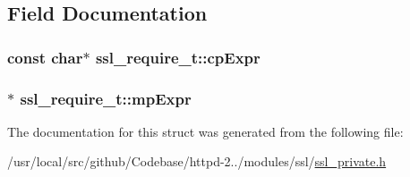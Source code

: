 \subsection{Field Documentation}
\subsubsection[{\texorpdfstring{cp\+Expr}{cpExpr}}]{\setlength{\rightskip}{0pt plus 5cm}const char$\ast$ ssl\+\_\+require\+\_\+t\+::cp\+Expr}\hypertarget{structssl__require__t_a2962efcc68c46e9e245b13d9da0d5d78}{}\label{structssl__require__t_a2962efcc68c46e9e245b13d9da0d5d78}
\subsubsection[{\texorpdfstring{mp\+Expr}{mpExpr}}]{$\ast$ ssl\+\_\+require\+\_\+t\+::mp\+Expr}\hypertarget{structssl__require__t_aeb1fc4e09d8a8155db75ab259d93e92f}{}\label{structssl__require__t_aeb1fc4e09d8a8155db75ab259d93e92f}


The documentation for this struct was generated from the following file\+:\begin{DoxyCompactItemize}
\item 
/usr/local/src/github/\+Codebase/httpd-\/2../modules/ssl/\hyperlink{ssl__private_8h}{ssl\+\_\+private.\+h}\end{DoxyCompactItemize}
